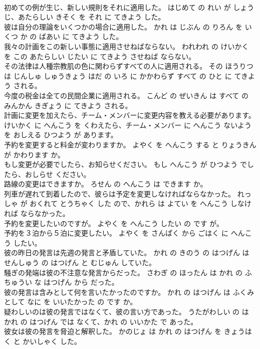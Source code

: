 \documentclass[8pt]{extreport}
\begin{document}
\begin{CJK}{UTF8}{min}
\\	初めての例が生じ、新しい規則をそれに適用した。	はじめて の れい が しょうじ、あたらしい きそく を それ に てきよう した。	
\\	彼は自分の理論をいくつかの場合に適用した。	かれ は じぶん の りろん を いくつ か の ばあい に てきよう した。	
\\	我々の計画をこの新しい事態に適用させねばならない。	われわれ の けいかく を この あたらしい じたい に てきよう させねば ならない。	
\\	その法律は人種宗教肌の色に関わらずすべての人に適用される。	その ほうりつ は じんしゅ しゅうきょう はだ の いろ に かかわらず すべて の ひと に てきよう される。	
\\	今度の税金は全ての民間企業に適用される。	こんど の ぜいきん は すべて の みんかん きぎょう に てきよう される。	
\\	計画に変更を加えたら、チーム・メンバーに変更内容を教える必要があります。	けいかく に へんこう を くわえたら、チーム・メンバー に へんこう ないよう を おしえる ひつよう が あります。	
\\	予約を変更すると料金が変わりますか。	よやく を へんこう する と りょうきん が かわります か。	
\\	もし変更が必要でしたら、お知らせください。	もし へんこう が ひつよう でしたら、おしらせ ください。	
\\	路線の変更はできますか。	ろせん の へんこう は できます か。	
\\	列車が遅れて到着したので、彼らは予定を変更しなければならなかった。	れっしゃ が おくれて とうちゃく した ので、かれら は よてい を へんこう しなければ ならなかった。	
\\	予約を変更したいのですが。	よやく を へんこう したい の です が。	
\\	予約を３泊から５泊に変更したい。	よやく を さんぱく から ごはく に へんこう したい。	
\\	彼の昨日の発言は先週の発言と矛盾していた。	かれ の きのう の はつげん は せんしゅう の はつげん と むじゅん していた。	
\\	騒ぎの発端は彼の不注意な発言からだった。	さわぎ の ほったん は かれ の ふちゅうい な はつげん から だった。	
\\	彼の発言は含みとして何を言いたかったのですか。	かれ の はつげん は ふくみ として なに を いいたかった の です か。	
\\	疑わしいのは彼の発言ではなくて、彼の言い方であった。	うたがわしい の は かれ の はつげん では なくて、かれ の いいかた で あった。	
\\	彼女は彼の発言を脅迫と解釈した。	かのじょ は かれ の はつげん を きょうはく と かいしゃく した。	

\end{CJK}
\end{document}
